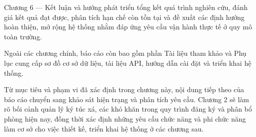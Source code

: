 \documentclass[../DoAn.tex]{subfiles}
\begin{document}
Chương 6 — Kết luận và hướng phát triển tổng kết quá trình nghiên cứu, đánh giá kết quả đạt được, phân tích hạn chế còn tồn tại và đề xuất các định hướng hoàn thiện, mở rộng hệ thống nhằm đáp ứng yêu cầu vận hành thực tế ở quy mô toàn trường.

Ngoài các chương chính, báo cáo còn bao gồm phần Tài liệu tham khảo và Phụ lục cung cấp sơ đồ cơ sở dữ liệu, tài liệu API, hướng dẫn cài đặt và triển khai hệ thống.

Từ mục tiêu và phạm vi đã xác định trong chương này, nội dung tiếp theo của báo cáo chuyển sang khảo sát hiện trạng và phân tích yêu cầu. Chương 2 sẽ làm rõ bối cảnh quản lý ký túc xá, các khó khăn trong quy trình đăng ký và phân bổ phòng hiện nay, đồng thời xác định những yêu cầu chức năng và phi chức năng làm cơ sở cho việc thiết kế, triển khai hệ thống ở các chương sau.
\end{document}

